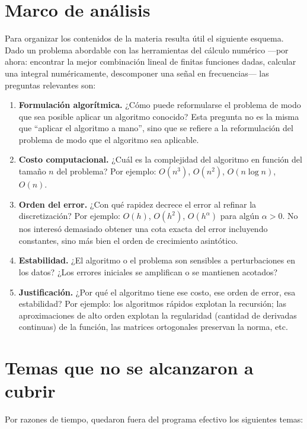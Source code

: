 \documentclass[12pt]{article}
\begin{document}
\section*{Marco de análisis}

Para organizar los contenidos de la materia resulta útil el siguiente esquema. Dado un problema abordable con las herramientas del cálculo numérico ---por ahora: encontrar la mejor combinación lineal de finitas funciones dadas, calcular una integral numéricamente, descomponer una señal en frecuencias--- las preguntas relevantes son:

\begin{enumerate}[(1)]
  \item \textbf{Formulación algorítmica.} ¿Cómo puede reformularse el problema de modo que sea posible aplicar un algoritmo conocido? Esta pregunta no es la misma que ``aplicar el algoritmo a mano'', sino que se refiere a la reformulación del problema de modo que el algoritmo sea aplicable. 
  \item \textbf{Costo computacional.} ¿Cuál es la complejidad del algoritmo en función del tamaño $n$ del problema? Por ejemplo: $O(n^3)$, $O(n^2)$, $O(n \log n)$, $O(n)$. 
  \item \textbf{Orden del error.} ¿Con qué rapidez decrece el error al refinar la discretización? Por ejemplo: $O(h)$, $O(h^2)$, $O(h^{\alpha})$ para algún $\alpha > 0$. No nos interesó demasiado obtener una cota exacta del error incluyendo constantes, sino más bien el orden de crecimiento asintótico.
  \item \textbf{Estabilidad.} ¿El algoritmo o el problema son sensibles a perturbaciones en los datos? ¿Los errores iniciales se amplifican o se mantienen acotados?
  \item \textbf{Justificación.} ¿Por qué el algoritmo tiene ese costo, ese orden de error, esa estabilidad? Por ejemplo: los algoritmos rápidos explotan la recursión; las aproximaciones de alto orden explotan la regularidad (cantidad de derivadas continuas) de la función, las matrices ortogonales preservan la norma, etc.
\end{enumerate}

\section*{Temas que no se alcanzaron a cubrir}

Por razones de tiempo, quedaron fuera del programa efectivo los siguientes temas:
\end{document}
